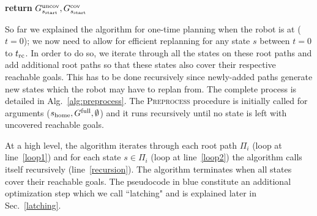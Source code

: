 \documentclass[conference]{IEEEtran}
\begin{document}
\begin{algorithm}[t]
\begin{algorithmic}[1]
    \EndFor
\EndFor
\EndIf
\State \textbf{return} $G^{\textrm{uncov}}_{s_{\textrm{start}}}, G^{\textrm{cov}}_{s_{\textrm{start}}}$
\EndProcedure
\end{algorithmic}
\end{algorithm}

%


So far we explained the algorithm for one-time planning when the robot is at \Shome ($t = 0$); we now need to allow for efficient replanning for any state $s$ between $t = 0$ to $t_{\textrm{rc}}$. In order to do so, we iterate through all the states on these root paths and add additional root paths so that these states also cover their respective reachable goals. This has to be done recursively since newly-added paths generate new states which the robot may have to replan from. The complete process is detailed in Alg.~\ref{alg:preprocess}. The \textsc{Preprocess} procedure is initially called for arguments ($s_{\textrm{home}}, G^{\textrm{full}}, \emptyset$) and it runs recursively until no state is left with uncovered reachable goals.
%

At a high level, the algorithm iterates through each root path $\Pi_i$ (loop at line~\ref{loop1}) and for each state $s \in \Pi_i$ (loop at line~\ref{loop2}) the algorithm calls itself recursively (line~\ref{recursion}). The algorithm terminates when all states cover their reachable goals. The pseudocode in blue constitute an additional optimization step which we call ``latching" and is explained later in Sec.~\ref{latching}.
%
\end{document}
